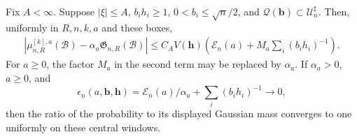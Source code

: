 \begin{theorem}
\label{thm:unsmoothed-window-denominator}
Fix $A<\infty$. Suppose $|\xi|\le A$, $b_ih_i\ge1$,
$0<b_i\le\sqrt n/2$, and
$\mathcal Q(\mathbf b)\subset\mathcal U_n^\sharp$.
Then, uniformly in $R,n,k,a$ and these boxes,
\begin{align}
 \left|\mu_{n,R}^{[k],a}(\mathcal B)
                      -\alpha_a\mathfrak G_{n,R}(\mathcal B)\right|
 \le C_A V(\mathbf h)
       \left(\mathcal E_n(a)+M_a\sum_i(b_ih_i)^{-1}\right).
 \label{eq:unsmoothed-window-denominator}
\end{align}
For $a\ge0$, the factor $M_a$ in the second term may be replaced by
$\alpha_a$. If $\alpha_a>0$, $a\ge0$, and
\begin{equation}\label{eq:window-relative-budget}
 \epsilon_n(a,\mathbf b,\mathbf h)
       =\mathcal E_n(a)/\alpha_a+\sum_i(b_ih_i)^{-1}\longrightarrow0,
\end{equation}
then the ratio of the probability to its displayed Gaussian mass
converges to one uniformly on these central windows.
\end{theorem}
